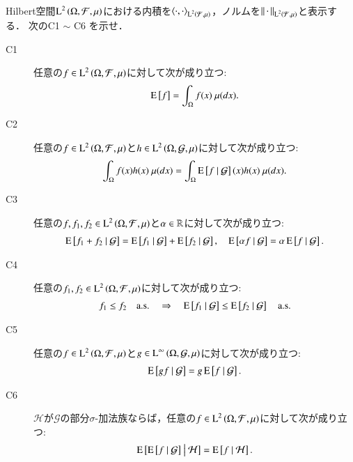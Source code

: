 	\begin{qst}\mbox{}\\
		Hilbert空間$\operatorname{L}^{2} \left(\Omega, \mathcal{F},\mu\right)$における内積を$\inprod<\cdot,\cdot>_{\Lp{2}{\mathcal{F},\mu}}$，ノルムを$\left\|\, \cdot\, \right\|_{\operatorname{L}^{2} \left(\mathcal{F},\mu\right)}$と表示する．
		次のC1 $\sim$ C6 を示せ．
		\begin{description}
			\item[C1] 任意の$f \in \operatorname{L}^{2} \left(\Omega, \mathcal{F},\mu\right)$に対して次が成り立つ:
				\begin{align}
					\operatorname{E} \left[ f \right] = \int_{\Omega} f(x)\ \mu(dx).
				\end{align}
				
			\item[C2]	任意の$f \in \operatorname{L}^{2} \left(\Omega, \mathcal{F},\mu\right)$と$h \in \operatorname{L}^{2} \left(\Omega, \mathcal{G},\mu\right)$に対して次が成り立つ:
				\begin{align}
					\int_{\Omega} f(x)h(x)\ \mu(dx) = \int_{\Omega} \operatorname{E} \left[ f \ \middle|\ \mathcal{G} \right](x)h(x)\ \mu(dx).
				\end{align}
				
			\item[C3]	任意の$f,f_1,f_2 \in \operatorname{L}^{2} \left(\Omega, \mathcal{F},\mu\right)$と$\alpha \in \mathbb{R}$に対して次が成り立つ:
				\begin{align}
					\operatorname{E} \left[ f_1 + f_2 \ \middle|\ \mathcal{G} \right] = \operatorname{E} \left[ f_1 \ \middle|\ \mathcal{G} \right] + \operatorname{E} \left[ f_2 \ \middle|\ \mathcal{G} \right],
					\quad \operatorname{E} \left[ \alpha f \ \middle|\ \mathcal{G} \right] = \alpha \operatorname{E} \left[ f \ \middle|\ \mathcal{G} \right].
				\end{align}

			\item[C4]	任意の$f_1,f_2 \in \operatorname{L}^{2} \left(\Omega, \mathcal{F},\mu\right)$に対して次が成り立つ:
				\begin{align}
					f_1 \leq f_2 \quad \mathrm{a.s.} \quad \Rightarrow \quad \operatorname{E} \left[ f_1 \ \middle|\ \mathcal{G} \right] \leq \operatorname{E} \left[ f_2 \ \middle|\ \mathcal{G} \right] \quad \mathrm{a.s.}
				\end{align}
			
			\item[C5]	任意の$f \in \operatorname{L}^{2} \left(\Omega, \mathcal{F},\mu\right)$と$g \in \operatorname{L}^{\infty} \left(\Omega, \mathcal{G},\mu\right)$に対して次が成り立つ:
				\begin{align}
					\operatorname{E} \left[ gf \ \middle|\ \mathcal{G} \right] = g\operatorname{E} \left[ f \ \middle|\ \mathcal{G} \right].
				\end{align}
			
			\item[C6]	$\mathcal{H}$が$\mathcal{G}$の部分$\sigma$-加法族ならば，任意の$f \in \operatorname{L}^{2} \left(\Omega, \mathcal{F},\mu\right)$に対して次が成り立つ:
				\begin{align}
					\operatorname{E} \left[ \operatorname{E} \left[ f \ \middle|\ \mathcal{G} \right] \ \middle|\ \mathcal{H} \right] = \operatorname{E} \left[ f \ \middle|\ \mathcal{H} \right].
				\end{align}
		\end{description}
	\end{qst}
	
